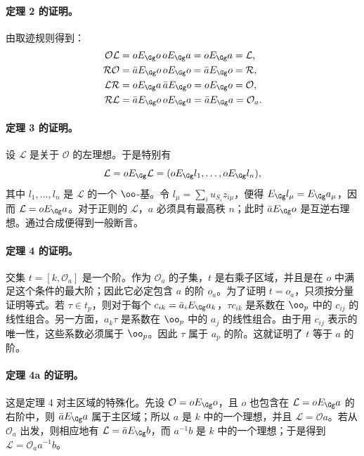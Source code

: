 \paragraph{定理 2 的证明。}
由取迹规则得到：
\[
\begin{aligned}
 \mathcal O\mathcal L&=oE_\Gg o\,oE_\Gg a=oE_\Gg a=\mathcal L,\\
 \mathcal R\mathcal O&=\bar aE_\Gg o\,oE_\Gg o=\bar aE_\Gg o=\mathcal R,\\
 \mathcal L\mathcal R&=oE_\Gg a\,\bar aE_\Gg o=oE_\Gg o=\mathcal O,\\
 \mathcal R\mathcal L&=\bar aE_\Gg o\,oE_\Gg a=\bar aE_\Gg a=\mathcal O_a.
\end{aligned}
\]

\paragraph{定理 3 的证明。}
设 \(\mathcal L\) 是关于 \(\mathcal O\) 的左理想。于是特别有
\[
        \mathcal L=oE_\Gg\mathcal L
        =(oE_\Gg l_1,\ldots,oE_\Gg l_n),
\]
其中 \(l_1,\ldots,l_n\) 是 \(\mathcal L\) 的一个 \(\oo\)-基。令 \(l_\mu=\sum_i u_{S_i}z_{i\mu}\)，便得 \(E_\Gg l_\mu=E_\Gg a_\mu\)，因而 \(\mathcal L=oE_\Gg a\)。对于正则的 \(\mathcal L\)，\(a\) 必须具有最高秩 \(n\)；此时 \(\bar aE_\Gg o\) 是互逆右理想。通过合成便得到一般断言。

\paragraph{定理 4 的证明。}
交集 \(t=[k,\mathcal O_a]\) 是一个阶。作为 \(\mathcal O_a\) 的子集，\(t\) 是右乘子区域，并且是在 \(o\) 中满足这个条件的最大阶；因此它必定包含 \(a\) 的阶 \(o_a\)。为了证明 \(t=o_a\)，只须按分量证明等式。若 \(\tau\in t_p\)，则对于每个 \(c_{ik}=\bar a_iE_\Gg a_k\)，\(\tau c_{ik}\) 是系数在 \(\oo_p\) 中的 \(c_{ij}\) 的线性组合。另一方面，\(a_k\tau\) 是系数在 \(\oo_p\) 中的 \(a_j\) 的线性组合。由于用 \(c_{ij}\) 表示的唯一性，这些系数必须属于 \(\oo_p\)。因此 \(\tau\) 属于 \(a_p\) 的阶。这就证明了 \(t\) 等于 \(a\) 的阶。

\paragraph{定理 4a 的证明。}
这是定理 4 对主区域的特殊化。先设 \(\mathcal O=oE_\Gg o\)，且 \(o\) 也包含在 \(\mathcal L=oE_\Gg a\) 的右阶中，则 \(\bar aE_\Gg a\) 属于主区域；所以 \(a\) 是 \(k\) 中的一个理想，并且 \(\mathcal L=\mathcal O a\)。若从 \(\mathcal O_a\) 出发，则相应地有 \(\mathcal L=\bar aE_\Gg b\)，而 \(a^{-1}b\) 是 \(k\) 中的一个理想；于是得到 \(\mathcal L=\mathcal O_a a^{-1}b\)。

